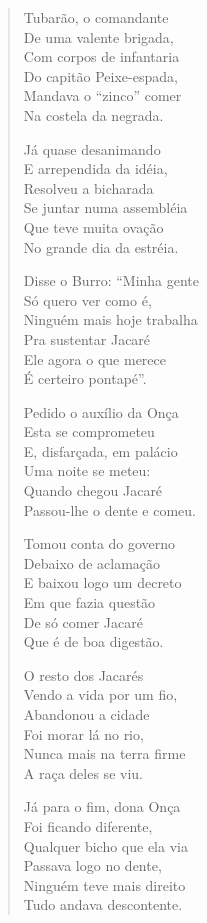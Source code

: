 \begin{verse}
Tubarão, o comandante\\
De uma valente brigada,\\
Com corpos de infantaria\\
Do capitão Peixe-espada,\\
Mandava o “zinco” comer\\
Na costela da negrada.

Já quase desanimando\\
E arrependida da idéia,\\
Resolveu a bicharada\\
Se juntar numa assembléia\\
Que teve muita ovação\\
No grande dia da estréia.

Disse o Burro: “Minha gente\\
Só quero ver como é,\\
Ninguém mais hoje trabalha\\
Pra sustentar Jacaré\\
Ele agora o que merece\\
É certeiro pontapé”.

Pedido o auxílio da Onça\\
Esta se comprometeu\\
E, disfarçada, em palácio\\
Uma noite se meteu:\\
Quando chegou Jacaré\\
Passou-lhe o dente e comeu.


Tomou conta do governo\\
Debaixo de aclamação\\
E baixou logo um decreto\\
Em que fazia questão\\
De só comer Jacaré\\
Que é de boa digestão.

O resto dos Jacarés\\
Vendo a vida por um fio,\\
Abandonou a cidade\\
Foi morar lá no rio,\\
Nunca mais na terra firme\\
A raça deles se viu.

Já para o fim, dona Onça\\
Foi ficando diferente,\\
Qualquer bicho que ela via\\
Passava logo no dente,\\
Ninguém teve mais direito\\
Tudo andava descontente.


\end{verse}
